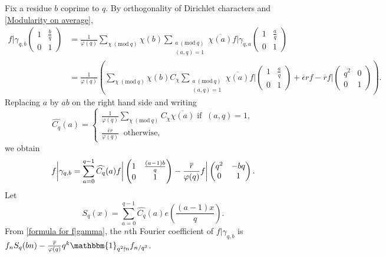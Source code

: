 \documentclass[a4paper,12.5pt]{amsart}
\theoremstyle{definition}
\theoremstyle{remark}
\newcommand{\Mod}[1]{\ (\mathrm{mod}\ #1)}
\begin{document}
                 Fix a residue $b$ coprime to $q$. 
                By orthogonality of Dirichlet characters and \eqref{Modularity on average}, 
                \begin{align*}  f\bigg|  \gamma_{q,b} \begin{pmatrix}
 1 & \frac{b}{q} \\
0 & 1    
                \end{pmatrix}&= \frac{1}{ \varphi(q)} \sum_{ \chi \Mod{q}} \chi(b) 
                \sum_{ \substack{ a \Mod q  \\ (a,q)=1       } } \overline{\chi(a)} f\bigg|   \gamma_{q,a} \begin{pmatrix}
 1 & \frac{a}{q} \\
0 & 1    
                \end{pmatrix}   \\ 
&= \frac{1}{\varphi(q)} \left( \sum_{ \chi \Mod q} \chi(b) C_{\chi}
                \sum_{ \substack{ a \Mod q  \\ (a,q)=1       } } \overline{\chi(a)} f\bigg|   \begin{pmatrix}
 1 & \frac{a}{q} \\
0 & 1    
                \end{pmatrix}   +    \overline{\epsilon} rf - \overline{r} f \bigg | 
             \begin{pmatrix}
 q^2 & 0 \\
0 & 1    
                \end{pmatrix}      \right)  .
                \end{align*}
                Replacing $a$ by $ab$ on the right hand side and writing 
                \[  \widehat{C_q}(a)=  \begin{cases}
                 \frac{1}{\varphi(q)} \sum_{ \chi \Mod{q}} C_{\chi} \overline{\chi(a)}  \; \text{if} \; \; (a,q)=1 , \\
                 \frac{\overline{\epsilon}r}{\varphi(q)} \; \; \text{otherwise},
                \end{cases}
                     \]
                     we obtain
                \begin{equation}{\label{formula for f|gamma}} f \bigg | \gamma_{q,b} =     \sum_{ a=0}^{q-1}  \widehat{C_q} (a)   f \bigg |   \begin{pmatrix}
 1 & \frac{(a-1)b}{q} \\
0 & 1    
                \end{pmatrix}    - \frac{\overline{r}}{\varphi(q)} f \bigg|  \begin{pmatrix}
 q^2 & -bq \\
0 & 1    
                \end{pmatrix}   .  \end{equation}
             Let 
                \[  S_q(x) =   \sum_{a=0}^{q-1}  \widehat{C_q} (a) e \left( \frac{(a-1)x}{q}    \right)           .    \]  From \eqref{formula for f|gamma}, the $n$th  Fourier coefficient of $f \bigg | \gamma_{q,b}$ is   $f_n S_q(bn)  - \frac{\overline{r}}{ \varphi(q)}q^k  \mathbbm{1} _{q^2 \nmid n}  f_{n/q^2}$. 
                \\
                 
\end{document}
